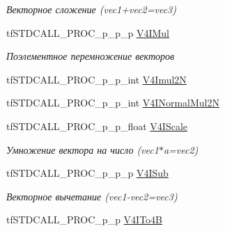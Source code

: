 \begin{DoxyCompactItemize}
\begin{DoxyCompactList}\small\item\em Векторное сложение (vec1+vec2=vec3) \end{DoxyCompactList}\item 
\hypertarget{structs_functions_vector_c_p_u_aff52ded645f077633dab34f80972fd88}{tf\-S\-T\-D\-C\-A\-L\-L\-\_\-\-P\-R\-O\-C\-\_\-p\-\_\-p\-\_\-p \hyperlink{structs_functions_vector_c_p_u_aff52ded645f077633dab34f80972fd88}{V4\-I\-Mul}}\label{structs_functions_vector_c_p_u_aff52ded645f077633dab34f80972fd88}

\begin{DoxyCompactList}\small\item\em Поэлементное перемножение векторов \end{DoxyCompactList}\item 
tf\-S\-T\-D\-C\-A\-L\-L\-\_\-\-P\-R\-O\-C\-\_\-p\-\_\-p\-\_\-int \hyperlink{structs_functions_vector_c_p_u_aee09397c9a10449717d707fe1e0ebd61}{V4\-Imul2\-N}
\item 
tf\-S\-T\-D\-C\-A\-L\-L\-\_\-\-P\-R\-O\-C\-\_\-p\-\_\-p\-\_\-int \hyperlink{structs_functions_vector_c_p_u_a3a2574652bd3927b6a343cf0442b2746}{V4\-I\-Normal\-Mul2\-N}
\item 
\hypertarget{structs_functions_vector_c_p_u_a76d392e76457e1f49d55413d5451ff29}{tf\-S\-T\-D\-C\-A\-L\-L\-\_\-\-P\-R\-O\-C\-\_\-p\-\_\-p\-\_\-float \hyperlink{structs_functions_vector_c_p_u_a76d392e76457e1f49d55413d5451ff29}{V4\-I\-Scale}}\label{structs_functions_vector_c_p_u_a76d392e76457e1f49d55413d5451ff29}

\begin{DoxyCompactList}\small\item\em Умножение вектора на число (vec1$\ast$a=vec2) \end{DoxyCompactList}\item 
\hypertarget{structs_functions_vector_c_p_u_afdff5326168173d11d3ed059ec5db5ac}{tf\-S\-T\-D\-C\-A\-L\-L\-\_\-\-P\-R\-O\-C\-\_\-p\-\_\-p\-\_\-p \hyperlink{structs_functions_vector_c_p_u_afdff5326168173d11d3ed059ec5db5ac}{V4\-I\-Sub}}\label{structs_functions_vector_c_p_u_afdff5326168173d11d3ed059ec5db5ac}

\begin{DoxyCompactList}\small\item\em Векторное вычетание (vec1-\/vec2=vec3) \end{DoxyCompactList}\item 
\hypertarget{structs_functions_vector_c_p_u_a9d43cc894d0ac2320dd6c250cd9a7fcf}{tf\-S\-T\-D\-C\-A\-L\-L\-\_\-\-P\-R\-O\-C\-\_\-p\-\_\-p \hyperlink{structs_functions_vector_c_p_u_a9d43cc894d0ac2320dd6c250cd9a7fcf}{V4\-I\-To4\-B}}\label{structs_functions_vector_c_p_u_a9d43cc894d0ac2320dd6c250cd9a7fcf}


\end{DoxyCompactItemize}
